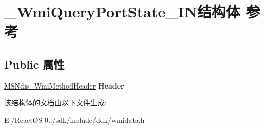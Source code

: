 \hypertarget{struct___wmi_query_port_state___i_n}{}\section{\+\_\+\+Wmi\+Query\+Port\+State\+\_\+\+I\+N结构体 参考}
\label{struct___wmi_query_port_state___i_n}
\subsection*{Public 属性}
\begin{DoxyCompactItemize}
\item 
\mbox{\label{struct___wmi_query_port_state___i_n_abe7d1c37acfae84de4edfcc1a2d75248}} 
\hyperlink{struct___m_s_ndis___wmi_method_header}{M\+S\+Ndis\+\_\+\+Wmi\+Method\+Header} {\bfseries Header}
\end{DoxyCompactItemize}


该结构体的文档由以下文件生成\+:\begin{DoxyCompactItemize}
\item 
E\+:/\+React\+O\+S-\/0../sdk/include/ddk/wmidata.\+h\end{DoxyCompactItemize}

